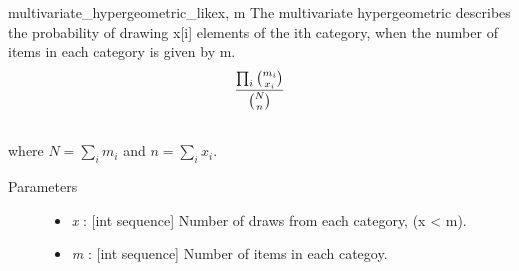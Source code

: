 \hypertarget{pymc.distributions.multivariate_hypergeometric_like}{}\begin{funcdesc}{multivariate\_hypergeometric\_like}{x, m}
The multivariate hypergeometric describes the probability of drawing x{[}i{]}
elements of the ith category, when the number of items in each category is
given by m.
\begin{gather}
\begin{split}\frac{\prod_i \binom{m_i}{x_i}}{\binom{N}{n}}\end{split}\notag\\\begin{split}\end{split}\notag
\end{gather}
where $N = \sum_i m_i$ and $n = \sum_i x_i$.
\begin{description}
\item[Parameters] \leavevmode\begin{itemize}
\item {} 
\emph{x} : {[}int sequence{]} Number of draws from each category, (x \textless{} m).

\item {} 
\emph{m} : {[}int sequence{]} Number of items in each categoy.

\end{itemize}

\end{description}
\end{funcdesc}

